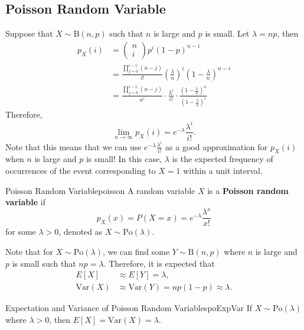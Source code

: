 \documentclass[math]{amznotes}
\theoremstyle{remark}
\begin{document}
\subsection{Poisson Random Variable}
Suppose that $X \sim \mathrm{B}(n, p)$ such that $n$ is large and $p$ is small. Let $\lambda = np$, then
\begin{align*}
    p_X(i) & = \begin{pmatrix}
        n \\
        i
    \end{pmatrix}p^i(1 - p)^{n - i} \\
    & = \frac{\prod_{j = 0}^{i - 1}(n - j)}{i!}\left(\frac{\lambda}{n}\right)^i\left(1 - \frac{\lambda}{n}\right)^{n - i} \\
    & = \frac{\prod_{j = 0}^{i - 1}(n - j)}{n^i}\cdot\frac{\lambda^i}{i!}\cdot\frac{\left(1 - \frac{\lambda}{n}\right)^n}{\left(1 - \frac{\lambda}{n}\right)^i}
\end{align*}
Therefore,
\begin{equation*}
    \lim_{n \to \infty}p_X(i) = e^{-\lambda}\frac{\lambda^i}{i!}.
\end{equation*}
Note that this means that we can use $e^{-\lambda}\frac{\lambda^i}{i!}$ as a good approximation for $p_X(i)$ when $n$ is large and $p$ is small! In this case, $\lambda$ is the expected frequency of occurrences of the event corresponding to $X = 1$ within a unit interval.
\begin{dfnbox}{Poisson Random Variable}{poisson}
    A random variable $X$ is a {\color{red} \textbf{Poisson random variable}} if 
    \begin{equation*}
        p_X(x) = P(X = x) = e^{-\lambda}\frac{\lambda^x}{x!}
    \end{equation*}
    for some $\lambda > 0$, denoted as $X \sim \mathrm{Po}(\lambda)$.
\end{dfnbox}
Note that for $X \sim \mathrm{Po}(\lambda)$, we can find some $Y \sim \mathrm{B}(n, p)$ where $n$ is large and $p$ is small such that $np = \lambda$. Therefore, it is expected that 
\begin{align*}
    E[X] & \approx E[Y] = \lambda, \\
    \mathrm{Var}(X) & \approx \mathrm{Var}(Y) = np(1 - p) \approx \lambda.
\end{align*}
\begin{thmbox}{Expectation and Variance of Poisson Random Variables}{poExpVar}
    If $X \sim \mathrm{Po}(\lambda)$ where $\lambda > 0$, then $E[X] = \mathrm{Var}(X) = \lambda$.
\end{thmbox}
\end{document}
